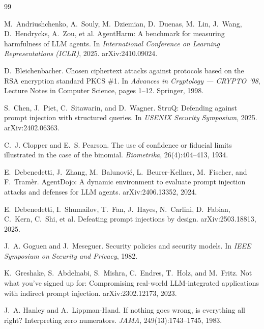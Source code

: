 \documentclass[12pt,oneside]{report}
\begin{document}
\clearpage
\begin{thebibliography}{99}

M.~Andriushchenko, A.~Souly, M.~Dziemian, D.~Duenas, M.~Lin, J.~Wang,
D.~Hendrycks, A.~Zou, et al.
\newblock AgentHarm: A benchmark for measuring harmfulness of {LLM} agents.
\newblock In \emph{International Conference on Learning Representations
  (ICLR)}, 2025. arXiv:2410.09024.

D.~Bleichenbacher.
\newblock Chosen ciphertext attacks against protocols based on the {RSA}
  encryption standard {PKCS} \#1.
\newblock In \emph{Advances in Cryptology --- CRYPTO '98}, Lecture Notes in
  Computer Science, pages 1--12. Springer, 1998.

S.~Chen, J.~Piet, C.~Sitawarin, and D.~Wagner.
\newblock StruQ: Defending against prompt injection with structured queries.
\newblock In \emph{USENIX Security Symposium}, 2025. arXiv:2402.06363.

C.~J. Clopper and E.~S. Pearson.
\newblock The use of confidence or fiducial limits illustrated in the case of
  the binomial.
\newblock \emph{Biometrika}, 26(4):404--413, 1934.

E.~Debenedetti, J.~Zhang, M.~Balunovi\'c, L.~Beurer-Kellner, M.~Fischer, and
  F.~Tram\`er.
\newblock AgentDojo: A dynamic environment to evaluate prompt injection attacks
  and defenses for {LLM} agents.
\newblock arXiv:2406.13352, 2024.

E.~Debenedetti, I.~Shumailov, T.~Fan, J.~Hayes, N.~Carlini, D.~Fabian,
  C.~Kern, C.~Shi, et al.
\newblock Defeating prompt injections by design.
\newblock arXiv:2503.18813, 2025.

J.~A. Goguen and J.~Meseguer.
\newblock Security policies and security models.
\newblock In \emph{IEEE Symposium on Security and Privacy}, 1982.

K.~Greshake, S.~Abdelnabi, S.~Mishra, C.~Endres, T.~Holz, and M.~Fritz.
\newblock Not what you've signed up for: Compromising real-world
  {LLM}-integrated applications with indirect prompt injection.
\newblock arXiv:2302.12173, 2023.

J.~A. Hanley and A.~Lippman-Hand.
\newblock If nothing goes wrong, is everything all right? {I}nterpreting zero
  numerators.
\newblock \emph{JAMA}, 249(13):1743--1745, 1983.


\end{thebibliography}
\end{document}
